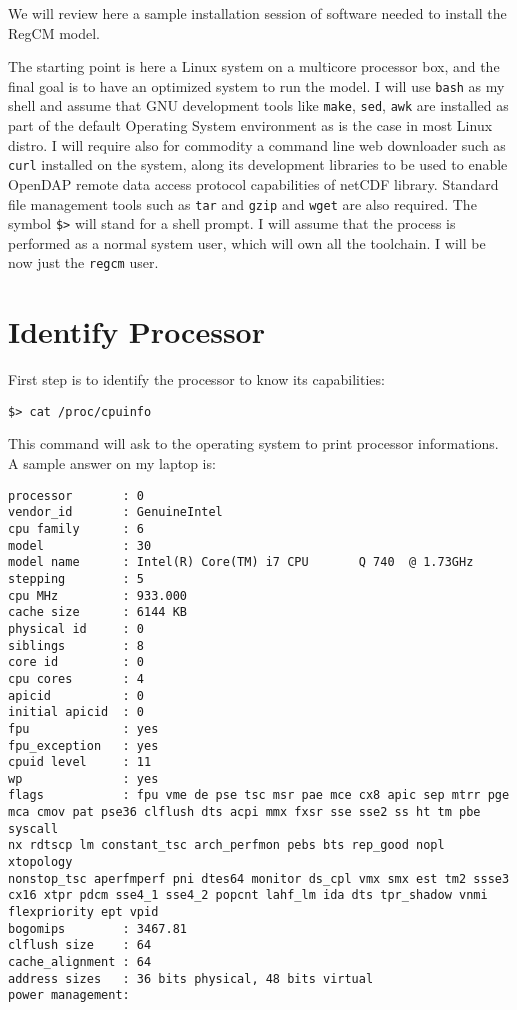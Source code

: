 %
%

We will review here a sample installation session of software needed to
install the RegCM model.

The starting point is here a Linux system on a multicore processor box, and
the final goal is to have an optimized system to run the model.
I will use \verb=bash= as my shell and assume that GNU development tools like
\verb=make=, \verb=sed=, \verb=awk= are installed as part of the default
Operating System environment as is the case in most Linux distro.
I will require also for commodity a command line web downloader such as
\verb=curl= installed on the system, along its development libraries to be
used to enable OpenDAP remote data access protocol capabilities of netCDF
library. Standard file management tools such as \verb=tar= and \verb=gzip=
and \verb=wget= are also required.
The symbol \verb=$>= will stand for a shell prompt.
I will assume that the process is performed as a normal system user, which
will own all the toolchain. I will be now just the \verb=regcm= user.

\section{Identify Processor}

First step is to identify the processor to know its capabilities:

\begin{Verbatim}
$> cat /proc/cpuinfo
\end{Verbatim}

This command will ask to the operating system to print processor informations.
A sample answer on my laptop is:

\begin{Verbatim}
processor       : 0
vendor_id       : GenuineIntel
cpu family      : 6
model           : 30
model name      : Intel(R) Core(TM) i7 CPU       Q 740  @ 1.73GHz
stepping        : 5
cpu MHz         : 933.000
cache size      : 6144 KB
physical id     : 0
siblings        : 8
core id         : 0
cpu cores       : 4
apicid          : 0
initial apicid  : 0
fpu             : yes
fpu_exception   : yes
cpuid level     : 11
wp              : yes
flags           : fpu vme de pse tsc msr pae mce cx8 apic sep mtrr pge
mca cmov pat pse36 clflush dts acpi mmx fxsr sse sse2 ss ht tm pbe syscall
nx rdtscp lm constant_tsc arch_perfmon pebs bts rep_good nopl xtopology
nonstop_tsc aperfmperf pni dtes64 monitor ds_cpl vmx smx est tm2 ssse3
cx16 xtpr pdcm sse4_1 sse4_2 popcnt lahf_lm ida dts tpr_shadow vnmi
flexpriority ept vpid
bogomips        : 3467.81                                                       
clflush size    : 64                                                            
cache_alignment : 64                                                            
address sizes   : 36 bits physical, 48 bits virtual                             
power management:
\end{Verbatim}

